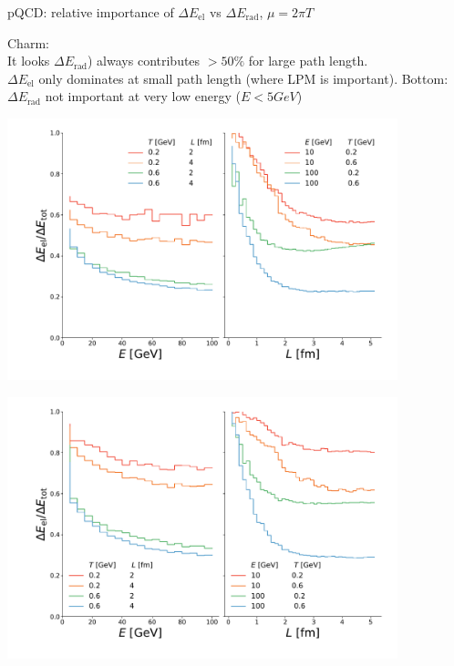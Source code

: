 \documentclass[11pt]{beamer}
\begin{document}
\begin{frame}{pQCD: relative importance of $\Delta E_{\textrm{el}}$ vs $\Delta E_{\textrm{rad}}$, $\mu = 2\pi T$}
\begin{overprint}
Charm: \\
It looks $\Delta E_{\textrm{rad}}$) always contributes $>50\%$ for large path length.\\
$\Delta E_{\textrm{el}}$ only dominates at small path length (where LPM is important).
Bottom: $\Delta E_{\textrm{rad}}$ not important at very low energy ($E<5 GeV$)
\end{overprint}

\begin{overprint}
\begin{center}
\includegraphics[width=0.85\textwidth]{fig/charm-plot/el_vs_inel.pdf}
\end{center}
\begin{center}
\includegraphics[width=0.85\textwidth]{fig/bottom-plot/el_vs_inel.pdf}
\end{center}
\end{overprint}
\end{frame}
\end{document}
